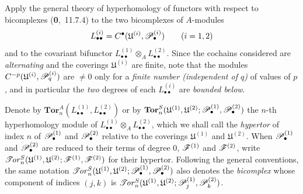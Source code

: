 \begin{env}[6.6.2]
\label{III.6.6.2}
Apply the general theory of hyperhomology of functors with
respect to bicomplexes (\textbf{0},~11.7.4) to the two
bicomplexes of $A$-modules
\[
  L_{\bullet\bullet}^{(i)}
  =
  C^\bullet(\mathfrak U^{(i)},\mathscr{P}_\bullet^{(i)})
  \qquad(i=1,2)
\]
and to the covariant bifunctor
$L_{\bullet\bullet}^{(1)}\otimes_A
 L_{\bullet\bullet}^{(2)}$.
Since the cochains considered are \emph{alternating} and the coverings
$\mathfrak U^{(i)}$ are finite, note that the modules $C^{-p}(\mathfrak U^{(i)},\mathscr{P}_q^{(i)})$
are $\neq0$ only for a \emph{finite number (independent of $q$)} of values of $p$,
and in particular the \emph{two} degrees of each
$L_{\bullet\bullet}^{(i)}$ are \emph{bounded below}.

Denote by $\mathbf{Tor}_n^A(L_{\bullet\bullet}^{(1)},L_{\bullet\bullet}^{(2)})$
or by $\mathbf{Tor}_n^S
(\mathfrak U^{(1)},\mathfrak U^{(2)};
\mathscr{P}_\bullet^{(1)},\mathscr{P}_\bullet^{(2)})$
the $n$-th hyperhomology module of
$L_{\bullet\bullet}^{(1)}\otimes_A
 L_{\bullet\bullet}^{(2)}$, which we shall call the \emph{hypertor} of index
$n$ of $\mathscr{P}_\bullet^{(1)}$ and $\mathscr{P}_\bullet^{(2)}$ relative
to the coverings $\mathfrak U^{(1)}$ and
$\mathfrak U^{(2)}$.  When $\mathscr{P}_\bullet^{(1)}$ and $\mathscr{P}_\bullet^{(2)}$ are reduced to
their terms of degree $0$, $\mathscr{F}^{(1)}$ and $\mathscr{F}^{(2)}$, write $\mathscr{T}\!\mathit{or}_n^S
(\mathfrak U^{(1)},\mathfrak U^{(2)};
\mathscr{F}^{(1)},\mathscr{F}^{(2)})$
for their hypertor.  Following the general conventions, the
same notation $\mathscr{T}\!\mathit{or}_n^S
(\mathfrak U^{(1)},\mathfrak U^{(2)};
\mathscr{P}_\bullet^{(1)},\mathscr{P}_\bullet^{(2)})$
also denotes the \emph{bicomplex} whose component of indices $(j,k)$
is $\mathscr{T}\!\mathit{or}_n^S
(\mathfrak U^{(1)},\mathfrak U^{(2)};
\mathscr{P}_j^{(1)},\mathscr{P}_k^{(2)})$.


\end{env}
